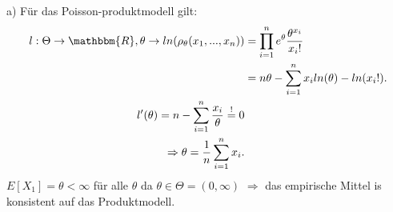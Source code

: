 \documentclass[draft]{article}
\begin{document}
\newpage

a) Für das Poisson-produktmodell gilt: 
\begin{align*}
    l : \Theta \rightarrow \mathbbm{R} , \theta \rightarrow ln(\rho_\theta(x_1,...,x_n)) & = \prod\limits_{i=1}^{n} e^\theta \frac{\theta^{x_i}}{x_i !} \\
    & = n\theta - \sum\limits_{i=1}^{n}x_i ln(\theta) - ln(x_i !) . \\
    l'(\theta) = n - \sum\limits_{i=1}^{n} \frac{x_i}{\theta} \overset{!}{=} 0 \\
    \Rightarrow \theta = \frac{1}{n}\sum\limits_{i=1}^{n}x_i . \\
\end{align*}
$E[X_1]=\theta<\infty$ für alle $\theta$ da $\theta\in\Theta=(0, \infty)$ \newline
$\Rightarrow$ das empirische Mittel is konsistent auf das Produktmodell. 
\end{document}

